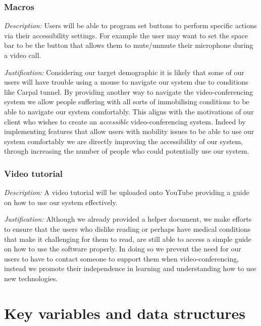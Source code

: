 \subsubsection{Macros}

\textit{Description:}
Users will be able to program set buttons to perform 
specific actions via their accessibility settings. For
example the user may want to set the space bar to be the
button that allows them to mute/unmute their microphone 
during a video call. \\ \vspace{0.2cm}

\textit{Justification:}
Considering our target demographic it is likely that 
some of our users will have trouble using a mouse 
to navigate our system due to conditions like Carpal tunnel.
By providing another way to navigate the video-conferencing 
system we allow people suffering with all sorts of 
immobilising conditions to be able to navigate our system 
comfortably. This aligns with the motivations of our client
who wishes to create an \textit{accessible} video-conferencing
system. Indeed by implementing features that allow users with
mobility issues to be able to use our system comfortably we 
are directly improving the accessibility of our system,
through increasing the number of people who could potentially 
use our system.

\subsubsection{Video tutorial}

\textit{Description:}
A video tutorial will be uploaded onto YouTube providing a 
guide on how to use our system effectively. \\ \vspace{0.2cm}

\textit{Justification:}
Although we already provided a helper document, we make
efforts to ensure that the users who dislike reading or
perhaps have medical conditions that make it challenging for 
them to read, are still able to access a simple guide on 
how to use the software properly. In doing so we prevent the 
need for our users to have to contact someone to support them
when video-conferencing, instead we promote their
independence in learning and understanding how to use new 
technologies.

\section{Key variables and data structures}

